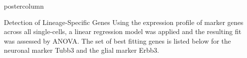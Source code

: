 \documentclass{beamer}
\newlength{\columnheight}
\begin{document}
\begin{frame}
\begin{columns}
\begin{column}{.45\textwidth}
\begin{beamercolorbox}[center]{postercolumn}
\begin{minipage}{.98\textwidth}
\parbox[t][\columnheight]{\textwidth}{
\begin{myblock}{Detection of Lineage-Specific Genes}
Using the expression profile of marker genes across all single-cells,
a linear regression model was applied and the resulting fit was assessed
by ANOVA. The set of best fitting genes is listed below for the neuronal
marker Tubb3 and the glial marker Erbb3.
\begin{figure}
\begin{minipage}{0.9\textwidth}

\end{minipage}
\end{figure}
\end{myblock}}
\end{minipage}
\end{beamercolorbox}
\end{column}
\end{columns}
\end{frame}
\end{document}
